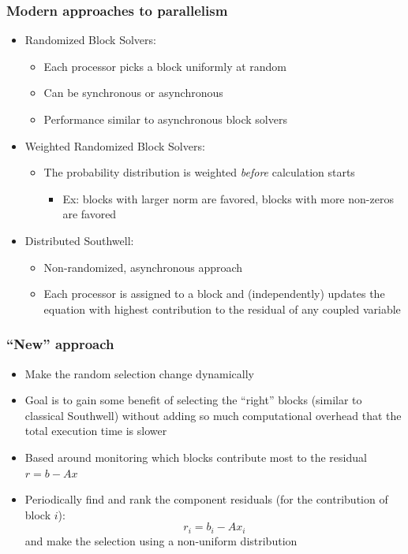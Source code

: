 \documentclass{beamer}
\begin{document}
\begin{frame}
	\frametitle{Modern approaches to parallelism}
	\begin{itemize}
		\item Randomized Block Solvers:
			\begin{itemize}
				\item Each processor picks a block uniformly at random
				\item Can be synchronous or asynchronous
				\item Performance similar to asynchronous block solvers
			\end{itemize}
		\item Weighted Randomized Block Solvers:
			\begin{itemize}
				\item The probability distribution is weighted {\em before} calculation starts
					\begin{itemize}
						\item Ex: blocks with larger norm are favored, blocks with more non-zeros are favored
					\end{itemize}
			\end{itemize}
		\item Distributed Southwell:
			\begin{itemize}
				\item Non-randomized, asynchronous approach
				\item Each processor is assigned to a block and (independently) updates the equation with highest contribution to the residual of any coupled variable
			\end{itemize}
	\end{itemize}
\end{frame}

\begin{frame}
	\frametitle{``New'' approach}
	\begin{itemize}
		\item Make the random selection change dynamically 
		\item Goal is to gain some benefit of selecting the ``right'' blocks (similar to classical Southwell) without adding so much computational overhead that the total execution time is slower
		\item Based around monitoring which blocks contribute most to the residual $r = b - Ax$
		\item Periodically find and rank the component residuals (for the contribution of block $i$):
			\begin{equation}
				r_i = b_i - Ax_i
			\end{equation}
			and make the selection using a non-uniform distribution
	\end{itemize}
\end{frame}
\end{document}
